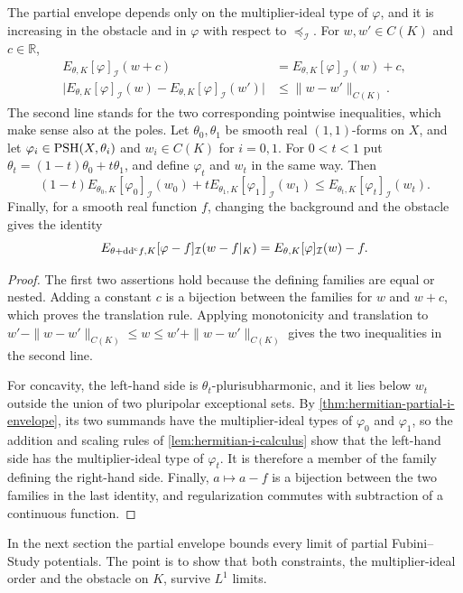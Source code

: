 \begin{proposition}\label{prop:partial-envelope-calculus}
The partial envelope depends only on the multiplier-ideal type of $\varphi$, and it is increasing in the obstacle and in $\varphi$ with respect to $\preceq_{\mathcal I}$. For $w,w'\in C(K)$ and $c\in\mathbb R$,
\[
 \begin{split}
 E_{\theta,K}[\varphi]_{\mathcal I}(w+c)
       &=E_{\theta,K}[\varphi]_{\mathcal I}(w)+c,\\
 \bigl|E_{\theta,K}[\varphi]_{\mathcal I}(w)
       -E_{\theta,K}[\varphi]_{\mathcal I}(w')\bigr|
       &\leq\|w-w'\|_{C(K)}.
 \end{split}
\]
The second line stands for the two corresponding pointwise inequalities, which make sense also at the poles. Let $\theta_0,\theta_1$ be smooth real $(1,1)$-forms on $X$, and let $\varphi_i\in\mathrm{PSH}(X,\theta_i)$ and $w_i\in C(K)$ for $i=0,1$. For $0<t<1$ put $\theta_t=(1-t)\theta_0+t\theta_1$, and define $\varphi_t$ and $w_t$ in the same way. Then
\[
 (1-t)E_{\theta_0,K}[\varphi_0]_{\mathcal I}(w_0)
       +tE_{\theta_1,K}[\varphi_1]_{\mathcal I}(w_1)
 \leq E_{\theta_t,K}[\varphi_t]_{\mathcal I}(w_t).
\]
Finally, for a smooth real function $f$, changing the background and the obstacle gives the identity
\[
 E_{\theta+\mathrm{dd}^{\mathrm{c}} f,K}[\varphi-f]_{\mathcal I}(w-f|_K)
       =E_{\theta,K}[\varphi]_{\mathcal I}(w)-f.
\]
\end{proposition}
\begin{proof}
The first two assertions hold because the defining families are equal or nested. Adding a constant $c$ is a bijection between the families for $w$ and $w+c$, which proves the translation rule. Applying monotonicity and translation to $w'-\|w-w'\|_{C(K)}\leq w\leq w'+\|w-w'\|_{C(K)}$ gives the two inequalities in the second line.

For concavity, the left-hand side is $\theta_t$-plurisubharmonic, and it lies below $w_t$ outside the union of two pluripolar exceptional sets. By \cref{thm:hermitian-partial-i-envelope}, its two summands have the multiplier-ideal types of $\varphi_0$ and $\varphi_1$, so the addition and scaling rules of \cref{lem:hermitian-i-calculus} show that the left-hand side has the multiplier-ideal type of $\varphi_t$. It is therefore a member of the family defining the right-hand side. Finally, $a\mapsto a-f$ is a bijection between the two families in the last identity, and regularization commutes with subtraction of a continuous function.
\end{proof}

In the next section the partial envelope bounds every limit of partial Fubini--Study potentials. The point is to show that both constraints, the multiplier-ideal order and the obstacle on $K$, survive $L^1$ limits.
